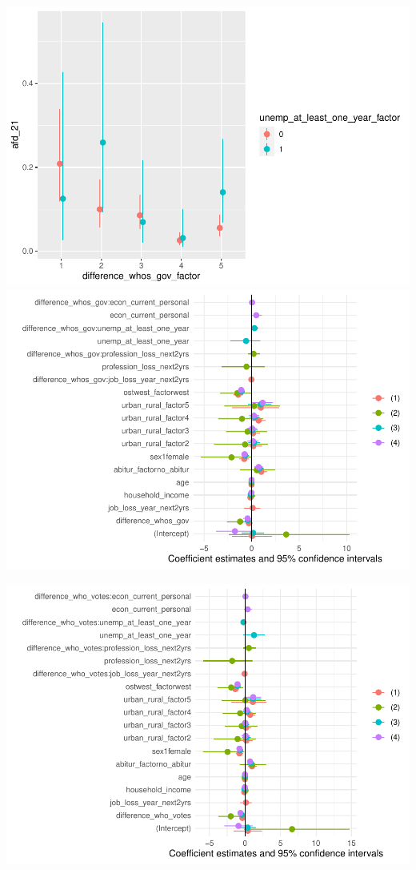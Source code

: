 \documentclass[
]{article}
\begin{document}
\includegraphics{AVCD_Draft_Assignment_Pruned_files/figure-latex/interaction-models-lack-rep1-1.pdf}
\includegraphics{AVCD_Draft_Assignment_Pruned_files/figure-latex/interaction-models-lack-rep1-2.pdf}

\includegraphics{AVCD_Draft_Assignment_Pruned_files/figure-latex/interaction-models-lack-rep2-1.pdf}
\end{document}
